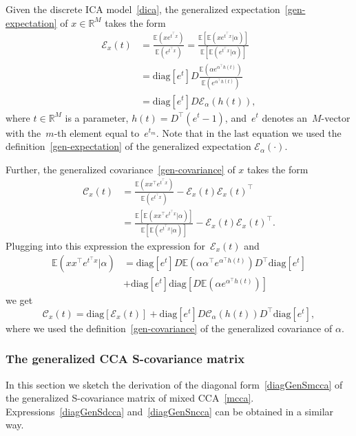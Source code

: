 \documentclass{article}
\newcommand{\sbra}[1]{\left[#1\right]}
\newcommand{\diag}{\mathrm{diag}}
\newcommand{\R}{\mathbb{R}}
\newcommand{\ebb}{\mathbb{E}}
\newcommand{\ccal}{\mathcal{C}}
\newcommand{\ecal}{\mathcal{E}}
\begin{document}
Given the discrete ICA model~\eqref{dica}, the generalized expectation~\eqref{gen-expectation} of $x\in\R^M$ takes the form
$$
\begin{aligned}
\ecal_x(t) &= \frac{ \ebb (x e^{t^{\top} x}) }{ \ebb (e^{t^{\top} x}) } 
 = \frac{ \ebb \sbra{ \ebb ( x e^{t^{\top} x} | \alpha )} }{ \ebb \sbra{ \ebb (e^{t^{\top} x} | \alpha )} } \\
& = \diag[e^t] D \frac{ \ebb (\alpha e^{\alpha^{\top} h(t) }) }{ \ebb( e^{\alpha^{\top} h(t) }) } \\
& = \diag[e^t] D \ecal_{\alpha} (h(t)),
\end{aligned}
$$
where $t\in\R^M$ is a parameter, $h(t)=D^{\top} (e^t - 1)$, and~$e^t$ denotes an~$M$-vector with the~$m$-th element equal to~$e^{t_m}$. 
Note that in the last equation we used the definition~\eqref{gen-expectation} of the generalized expectation $\ecal_{\alpha} (\cdot)$.

Further, the generalized covariance~\eqref{gen-covariance} of $x$ takes the form
$$
\begin{aligned}
\ccal_x(t) & = \frac{\ebb (xx^{\top} e^{t^{\top}x}) }{\ebb ( e^{t^{\top}x} ) } - \ecal_x(t) \ecal_x(t)^{\top} \\
& = \frac{\ebb \sbra{ \ebb (xx^{\top} e^{t^{\top}x} | \alpha)} }{\ebb\sbra{ \ebb ( e^{t^{\top}x} | \alpha) }  }- \ecal_x(t) \ecal_x(t)^{\top}.
\end{aligned}
$$
Plugging into this expression the expression for~$\ecal_x(t)$ and 
$$
\begin{aligned}
\ebb (xx^{\top} e^{t^{\top}x} | \alpha) &= \diag[e^t]D\ebb ({\alpha\alpha^{\top}e^{\alpha^{\top}h(t)}}) D^{\top} \diag[e^t] \\
&+ \diag[e^t]\diag\sbra{D\ebb ({\alpha e^{\alpha^{\top}h(t)}}) }
\end{aligned}
$$
we get
$$
\ccal_x(t)  = \diag[\ecal_x(t)] + \diag[e^t]{D} \ccal_{\alpha} (h(t)) {D}^{\top}\diag[e^t],
$$
where we used the definition~\eqref{gen-covariance} of the generalized covariance of $\alpha$.

\subsubsection{The generalized CCA S-covariance matrix}
\label{app:derivations-cca-generalized-covariances}
In this section we sketch the derivation of the diagonal form~\eqref{diagGenSmcca} of the generalized S-covariance matrix of mixed CCA~\eqref{mcca}. Expressions~\eqref{diagGenSdcca} and~\eqref{diagGenSncca} can be obtained in a similar way.
\end{document}
